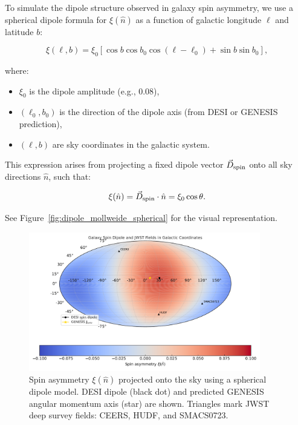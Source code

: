 \documentclass{article}
\begin{document}
To simulate the dipole structure observed in galaxy spin asymmetry, we use a spherical dipole formula for $\xi(\hat{n})$ as a function of galactic longitude $\ell$ and latitude $b$:

\begin{equation}
\xi(\ell, b) = \xi_0 \left[ \cos b \cos b_0 \cos(\ell - \ell_0) + \sin b \sin b_0 \right],
\end{equation}

where:
\begin{itemize}
  \item $\xi_0$ is the dipole amplitude (e.g., 0.08),
  \item $(\ell_0, b_0)$ is the direction of the dipole axis (from DESI or GENESIS prediction),
  \item $(\ell, b)$ are sky coordinates in the galactic system.
\end{itemize}

This expression arises from projecting a fixed dipole vector $\vec{D}_{\rm spin}$ onto all sky directions $\hat{n}$, such that:

\[
\xi(\hat{n}) = \vec{D}_{\rm spin} \cdot \hat{n} = \xi_0 \cos \theta.
\]

\vspace{0.2cm}
\noindent
See Figure~\ref{fig:dipole_mollweide_spherical} for the visual representation.



\begin{figure}[h!]
\centering
\includegraphics[width=0.9\textwidth]{Spin_Dipole_Mollweide_JWST_corrected.pdf}
\caption{Spin asymmetry $\xi(\hat{n})$ projected onto the sky using a spherical dipole model. DESI dipole (black dot) and predicted GENESIS angular momentum axis (star) are shown. Triangles mark JWST deep survey fields: CEERS, HUDF, and SMACS0723.}
\label{fig:spin_dipole_final}
\end{figure}
\end{document}
